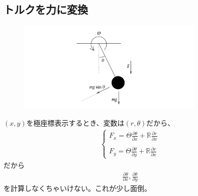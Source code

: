 \documentclass[a4paper,11pt]{jsarticle}
\begin{document}
\subsection{トルクを力に変換}
\begin{figure}[t]
  \centering
  \includegraphics[width = 0.8\textwidth]{20210514_Single_Pendulumpng_With_Tau.png}
  \caption{}
  \label{}
\end{figure}
$(x,y)$を極座標表示するとき、変数は$(r,\theta)$だから、
\begin{align*}
  \begin{cases}
    \displaystyle F_x = \Theta \frac{\partial \theta}{\partial x} + \mathbb{R} \frac{\partial r}{\partial x}
    \\
    \\ \displaystyle F_y = \Theta \frac{\partial \theta}{\partial y} + \mathbb{R} \frac{\partial r}{\partial x}
  \end{cases}
\end{align*}
だから
\begin{align*}
  \frac{\partial \theta}{\partial x}, \frac{\partial \theta}{\partial y}
\end{align*}
を計算しなくちゃいけない。これが少し面倒。
\end{document}
